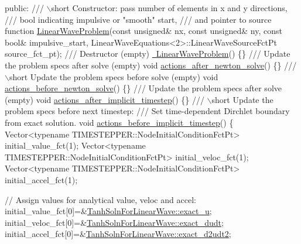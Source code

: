 \begin{DoxyCodeInclude}
\textcolor{keyword}{public}:
\textcolor{comment}{}
\textcolor{comment}{ /// \(\backslash\)short Constructor: pass number of elements in x and y directions,}
\textcolor{comment}{ /// bool indicating impulsive or "smooth" start,}
\textcolor{comment}{ /// and pointer to source function}
\textcolor{comment}{} \hyperlink{classLinearWaveProblem_a459a58b7afd588cfa78a5e1e98c3c41e}{LinearWaveProblem}(\textcolor{keyword}{const} \textcolor{keywordtype}{unsigned}& nx, \textcolor{keyword}{const} \textcolor{keywordtype}{unsigned}& ny, 
                   \textcolor{keyword}{const} \textcolor{keywordtype}{bool}& impulsive\_start,
                   LinearWaveEquations<2>::LinearWaveSourceFctPt source\_fct\_pt);
\textcolor{comment}{}
\textcolor{comment}{ /// Destructor (empty) }
\textcolor{comment}{} \hyperlink{classLinearWaveProblem_af1f3879114813b0acdfd2567c5c7b1e9}{~LinearWaveProblem}() \{\}
\textcolor{comment}{}
\textcolor{comment}{ /// Update the problem specs after solve (empty)}
\textcolor{comment}{} \textcolor{keywordtype}{void} \hyperlink{classLinearWaveProblem_a5b45c619af141b19162f990a95490e80}{actions\_after\_newton\_solve}() \{\}
\textcolor{comment}{}
\textcolor{comment}{ /// \(\backslash\)short Update the problem specs before solve (empty)}
\textcolor{comment}{} \textcolor{keywordtype}{void} \hyperlink{classLinearWaveProblem_a66e87510f6fa8af693cede514cb7a62e}{actions\_before\_newton\_solve}() \{\}
\textcolor{comment}{}
\textcolor{comment}{ /// Update the problem specs after solve (empty)}
\textcolor{comment}{} \textcolor{keywordtype}{void} \hyperlink{classLinearWaveProblem_a521290f43f9aac37c9604e744fa71075}{actions\_after\_implicit\_timestep}() \{\}
\textcolor{comment}{}
\textcolor{comment}{ /// \(\backslash\)short Update the problem specs before next timestep: }
\textcolor{comment}{ /// Set time-dependent Dirchlet boundary from exact solution.}
\textcolor{comment}{} \textcolor{keywordtype}{void} \hyperlink{classLinearWaveProblem_a39cfcb8ce06463ace1ac09fa43afa00a}{actions\_before\_implicit\_timestep}()
  \{
   Vector<typename TIMESTEPPER::NodeInitialConditionFctPt> 
    initial\_value\_fct(1);
   Vector<typename TIMESTEPPER::NodeInitialConditionFctPt>
    initial\_veloc\_fct(1);
   Vector<typename TIMESTEPPER::NodeInitialConditionFctPt> 
    initial\_accel\_fct(1);
   
   \textcolor{comment}{// Assign values for analytical value, veloc and accel:}
   initial\_value\_fct[0]=&\hyperlink{namespaceTanhSolnForLinearWave_aceea2935b2d3815ce72aae8c9de2b468}{TanhSolnForLinearWave::exact\_u};
   initial\_veloc\_fct[0]=&\hyperlink{namespaceTanhSolnForLinearWave_aa2081bd3d3d518a38497f664b0e498bc}{TanhSolnForLinearWave::exact\_dudt};
   initial\_accel\_fct[0]=&\hyperlink{namespaceTanhSolnForLinearWave_a63b7a0f5fd5d06cc2c0a43322a81fe43}{TanhSolnForLinearWave::exact\_d2udt2};
   

\end{DoxyCodeInclude}

